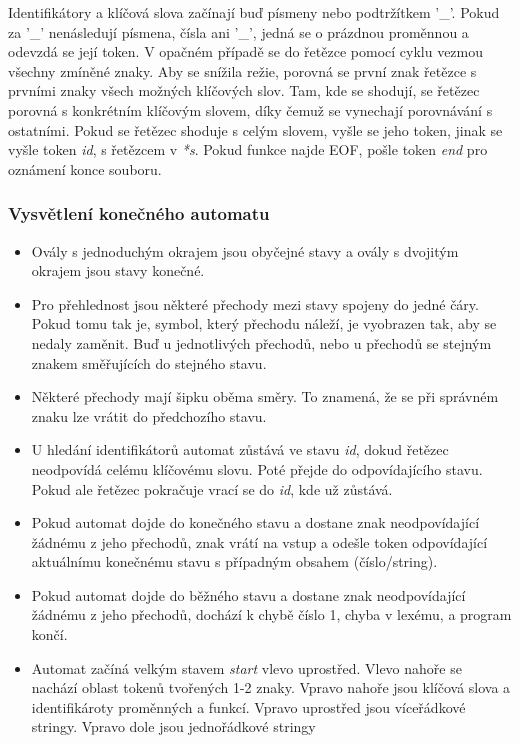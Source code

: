 \documentclass[a4paper, 12pt]{article}
\begin{document}
Identifikátory a klíčová slova začínají buď písmeny nebo podtržítkem '\_'. Pokud za '\_' nenásledují písmena, čísla ani '\_', jedná se o prázdnou proměnnou a odevzdá se její token. V opačném případě se do řetězce pomocí cyklu vezmou všechny zmíněné znaky. Aby se snížila režie, porovná se první znak řetězce s prvními znaky všech možných klíčových slov. Tam, kde se shodují, se řetězec porovná s konkrétním klíčovým slovem, díky čemuž se vynechají porovnávání s ostatními. Pokud se řetězec shoduje s celým slovem, vyšle se jeho token, jinak se vyšle token \textit{id}, s řetězcem v \textit{*s}.\newline
Pokud funkce najde EOF, pošle token \textit{end} pro oznámení konce souboru.\newline

\subsubsection{Vysvětlení konečného automatu}
\begin{itemize}
    \item Ovály s jednoduchým okrajem jsou obyčejné stavy a ovály s dvojitým okrajem jsou stavy konečné.
    \item Pro přehlednost jsou některé přechody mezi stavy spojeny do jedné čáry. Pokud tomu tak je, symbol, který přechodu náleží, je vyobrazen tak, aby se nedaly zaměnit. Buď u jednotlivých přechodů, nebo u přechodů se stejným znakem směřujících do stejného stavu. 
    \item Některé přechody mají šipku oběma směry. To znamená, že se při správném znaku lze vrátit do předchozího stavu.
    \item U hledání identifikátorů automat zůstává ve stavu \textit{id}, dokud řetězec neodpovídá celému klíčovému slovu. Poté přejde do odpovídajícího stavu. Pokud ale řetězec pokračuje vrací se do \textit{id}, kde už zůstává.
    \item Pokud automat dojde do konečného stavu a dostane znak neodpovídající žádnému z jeho přechodů, znak vrátí na vstup a odešle token odpovídající aktuálnímu konečnému stavu s případným obsahem (číslo/string).
    \item Pokud automat dojde do běžného stavu a dostane znak neodpovídající žádnému z jeho přechodů, dochází k chybě číslo 1, chyba v lexému, a program končí.
    \item Automat začíná velkým stavem \textit{start} vlevo uprostřed. Vlevo nahoře se nachází oblast tokenů tvořených 1-2 znaky. Vpravo nahoře jsou klíčová slova a identifikároty proměnných a funkcí. Vpravo uprostřed jsou víceřádkové stringy. Vpravo dole jsou jednořádkové stringy
\end{itemize}
\end{document}
